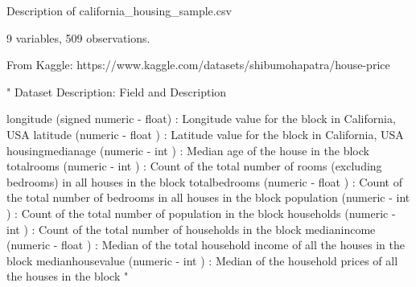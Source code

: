 Description of california_housing_sample.csv

9 variables, 509 observations.

From Kaggle: https://www.kaggle.com/datasets/shibumohapatra/house-price

"
Dataset Description:
Field and Description

longitude (signed numeric - float) : Longitude value for the block in California, USA
latitude (numeric - float ) : Latitude value for the block in California, USA
housingmedianage (numeric - int ) : Median age of the house in the block
totalrooms (numeric - int ) : Count of the total number of rooms (excluding bedrooms) in all houses in the block 
totalbedrooms (numeric - float ) : Count of the total number of bedrooms in all houses in the block
population (numeric - int ) : Count of the total number of population in the block
households (numeric - int ) : Count of the total number of households in the block
medianincome (numeric - float ) : Median of the total household income of all the houses in the block 
medianhousevalue (numeric - int ) : Median of the household prices of all the houses in the block
"

